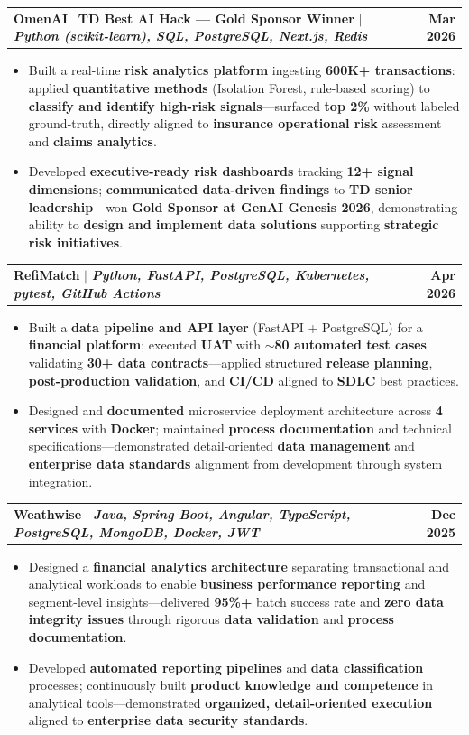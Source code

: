 \documentclass[letterpaper,10pt]{article}
\makeatletter
\newcommand{\resumeItem}[1]{
  \item\small{
    {#1 \vspace{-1pt}}
  }
}
\newcommand{\resumeProjectHeading}[2]{
    \item
    \begin{tabular*}{1.001\textwidth}{l@{\extracolsep{\fill}}r}
      \small#1 & \textbf{\small #2}\\
    \end{tabular*}\vspace{-9pt}
}
\newcommand{\resumeItemListStart}{\begin{itemize}[leftmargin=0.15in]}
\newcommand{\resumeItemListEnd}{\end{itemize}\vspace{-4pt}}
\makeatother
\begin{document}
    \resumeProjectHeading
          {\textbf{OmenAI} \textbar\ \textbf{TD Best AI Hack --- Gold Sponsor Winner} $|$ \emph{\textbf{Python (scikit-learn), SQL, PostgreSQL, Next.js, Redis}}}{Mar 2026}
    \resumeItemListStart
        \resumeItem{Built a real-time \textbf{risk analytics platform} ingesting \textbf{600K+ transactions}: applied \textbf{quantitative methods} (Isolation Forest, rule-based scoring) to \textbf{classify and identify high-risk signals}---surfaced \textbf{top 2\%} without labeled ground-truth, directly aligned to \textbf{insurance operational risk} assessment and \textbf{claims analytics}.}
        \vspace{-2pt}
        \resumeItem{Developed \textbf{executive-ready risk dashboards} tracking \textbf{12+ signal dimensions}; \textbf{communicated data-driven findings} to \textbf{TD senior leadership}---won \textbf{Gold Sponsor at GenAI Genesis 2026}, demonstrating ability to \textbf{design and implement data solutions} supporting \textbf{strategic risk initiatives}.}
    \resumeItemListEnd
    \vspace{-18pt}

    \resumeProjectHeading
        {\textbf{RefiMatch} $|$ \emph{\textbf{Python, FastAPI, PostgreSQL, Kubernetes, pytest, GitHub Actions}}}{Apr 2026}
        \resumeItemListStart
            \resumeItem{Built a \textbf{data pipeline and API layer} (FastAPI + PostgreSQL) for a \textbf{financial platform}; executed \textbf{UAT} with \textbf{$\sim$80 automated test cases} validating \textbf{30+ data contracts}---applied structured \textbf{release planning}, \textbf{post-production validation}, and \textbf{CI/CD} aligned to \textbf{SDLC} best practices.}
            \vspace{-2pt}
            \resumeItem{Designed and \textbf{documented} microservice deployment architecture across \textbf{4 services} with \textbf{Docker}; maintained \textbf{process documentation} and technical specifications---demonstrated detail-oriented \textbf{data management} and \textbf{enterprise data standards} alignment from development through system integration.}
        \resumeItemListEnd
    \vspace{-18pt}

    \resumeProjectHeading
          {\textbf{Weathwise} $|$ \emph{\textbf{Java, Spring Boot, Angular, TypeScript, PostgreSQL, MongoDB, Docker, JWT}}}{Dec 2025}
          \resumeItemListStart
            \resumeItem{Designed a \textbf{financial analytics architecture} separating transactional and analytical workloads to enable \textbf{business performance reporting} and segment-level insights---delivered \textbf{95\%+} batch success rate and \textbf{zero data integrity issues} through rigorous \textbf{data validation} and \textbf{process documentation}.}
            \vspace{-2pt}
            \resumeItem{Developed \textbf{automated reporting pipelines} and \textbf{data classification} processes; continuously built \textbf{product knowledge and competence} in analytical tools---demonstrated \textbf{organized, detail-oriented execution} aligned to \textbf{enterprise data security standards}.}
          \resumeItemListEnd
    \vspace{-8pt}
\end{document}
